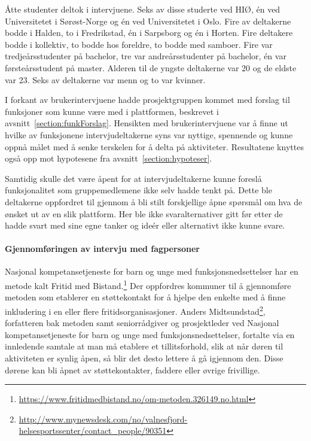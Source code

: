 Åtte studenter deltok i intervjuene. Seks av disse studerte ved HIØ, én ved Universitetet i Sørøst-Norge og én ved Universitetet i Oslo. Fire av deltakerne bodde i Halden, to i Fredrikstad, én i Sarpsborg og én i Horten. Fire deltakere bodde i kollektiv, to bodde hos foreldre, to bodde med samboer. Fire var tredjeårsstudenter på bachelor, tre var andreårsstudenter på bachelor, én var førsteårsstudent på master. Alderen til de yngste deltakerne var 20 og de eldste var 23. Seks av deltakerne var menn og to var kvinner.

I forkant av brukerintervjuene hadde prosjektgruppen kommet med forslag til funksjoner som kunne være med i plattformen, beskrevet i avsnitt~\ref{section:funkForslag}. Hensikten med brukerintervjuene var å finne ut hvilke av funksjonene intervjudeltakerne syns var nyttige, spennende og kunne oppnå målet med å senke terskelen for å delta på aktiviteter. Resultatene knyttes også opp mot hypotesene fra avsnitt~\ref{section:hypoteser}.

Samtidig skulle det være åpent for at intervjudeltakerne kunne foreslå funksjonalitet som gruppemedlemene ikke selv hadde tenkt på. Dette ble deltakerne oppfordret til gjennom å bli stilt forskjellige åpne spørsmål om hva de ønsket ut av en slik plattform. Her ble ikke svaralternativer gitt før etter de hadde svart med sine egne tanker og ideér eller alternativt ikke kunne svare.

\paragraph{Gjennomføringen av intervju med fagpersoner}
Nasjonal kompetansetjeneste for barn og unge med funksjonsnedsettelser har en metode kalt Fritid med Bistand.\footnote{\url{https://www.fritidmedbistand.no/om-metoden.326149.no.html}} Der oppfordres kommuner til å gjennomføre metoden som etablerer en støttekontakt for å hjelpe den enkelte med å finne inkludering i en eller flere fritidsorganisasjoner. Anders Midtsundstad\footnote{\url{http://www.mynewsdesk.com/no/valnesfjord-helsesportssenter/contact_people/90351}},  
 forfatteren bak metoden samt seniorrådgiver og prosjektleder ved Nasjonal kompetansetjeneste for barn og unge med funksjonsnedsettelser, fortalte via en innledende samtale at man må etablere et tillitsforhold, slik at når døren til aktiviteten er synlig åpen, så blir det desto lettere å gå igjennom den. Disse dørene kan bli åpnet av støttekontakter, faddere eller øvrige frivillige. 
 
 \vspace{5mm} %


